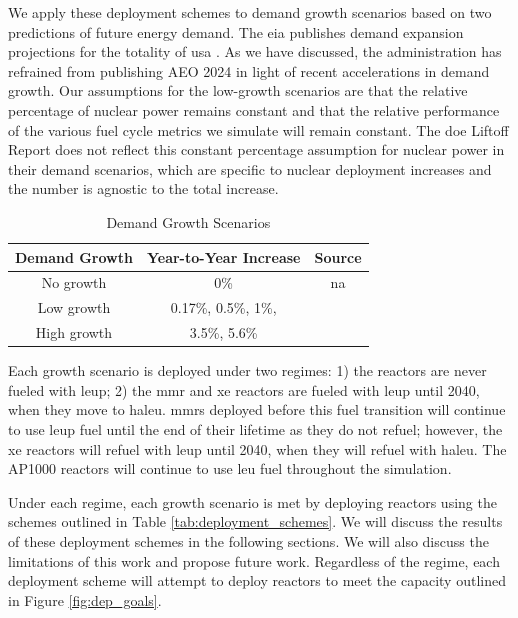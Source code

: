 We apply these deployment schemes to demand growth scenarios based on two
predictions of future energy demand. The \gls{eia} publishes demand expansion
projections for the totality of \gls{usa} \cite{eia_aeo_2023}. As we have
discussed, the administration has refrained from publishing AEO 2024 in light
of recent accelerations in demand growth. Our assumptions for the low-growth
scenarios are that the relative percentage of nuclear power remains constant
and that the relative performance of the various fuel cycle metrics we simulate
will remain constant. The \gls{doe} Liftoff Report
\cite{julie_liftoff_pathways_2024} does not reflect this constant percentage
assumption for nuclear power in their demand scenarios, which are specific to
nuclear deployment increases and the number is agnostic to the total increase.

\begin{table}[H]
    \centering
    \caption{Demand Growth Scenarios}
    \label{tab:demand_scenarios}
    \begin{tabular}{c c c}
        \hline
        \textbf{Demand Growth} & \textbf{Year-to-Year Increase} & \textbf{Source}\\
        \hline
        No growth & 0\% & na\\
        Low growth & 0.17\%, 0.5\%, 1\%, & \cite{eia_aeo_2023}\\
        High growth & 3.5\%, 5.6\% & \cite{julie_liftoff_pathways_2024}\\
        \hline
    \end{tabular}
\end{table}

Each growth scenario is deployed under two regimes: 1) the reactors are never
fueled with \gls{leup}; 2) the \gls{mmr} and \gls{xe} reactors are fueled with
\gls{leup} until 2040, when they move to \gls{haleu}. \glspl{mmr} deployed
before this fuel transition will continue to use \gls{leup} fuel until the end
of their lifetime as they do not refuel; however, the \gls{xe} reactors will
refuel with \gls{leup} until 2040, when they will refuel with \gls{haleu}. The
AP1000 reactors will continue to use \gls{leu} fuel throughout the simulation.

Under each regime, each growth scenario is met by deploying reactors using the
schemes outlined in Table \ref{tab:deployment_schemes}. We will discuss the
results of these deployment schemes in the following sections. We will also
discuss the limitations of this work and propose future work. Regardless of the
regime, each deployment scheme will attempt to deploy reactors to meet the
capacity outlined in Figure \ref{fig:dep_goals}.

